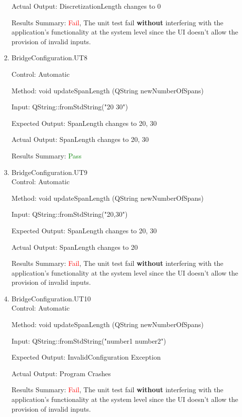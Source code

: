 \documentclass[12pt, titlepage]{article}
\begin{document}
\begin{enumerate}
    Actual Output: DiscretizationLength changes to 0

    Results Summary: \textcolor{red} {Fail}, The unit test fail
\textbf{without} interfering with the application’s functionality at the system level
since the UI doesn’t allow the provision of invalid inputs.

    \item {BridgeConfiguration.UT8\\}

    Control: Automatic
    
    Method:  void updateSpanLength (QString newNumberOfSpans)
    
    Input: QString::fromStdString("20 30")
    
    Expected Output: SpanLength changes to {20, 30}

    Actual Output: SpanLength changes to {20, 30}

    Results Summary: \textcolor{green} {Pass}

    \item {BridgeConfiguration.UT9\\}
    Control: Automatic
    
    Method:  void updateSpanLength (QString newNumberOfSpans)
    
    Input: QString::fromStdString("20,30")
    
    Expected Output: SpanLength changes to {20, 30}

    Actual Output: SpanLength changes to {20}

    Results Summary: \textcolor{red} {Fail}, The unit test fail
\textbf{without} interfering with the application’s functionality at the system level
since the UI doesn’t allow the provision of invalid inputs.

    \item {BridgeConfiguration.UT10\\}
    Control: Automatic
    
    Method:  void updateSpanLength (QString newNumberOfSpans)
    
    Input: QString::fromStdString("number1 number2")
    
    Expected Output: InvalidConfiguration Exception

    Actual Output: Program Crashes

    Results Summary: \textcolor{red} {Fail}, The unit test fail
\textbf{without} interfering with the application’s functionality at the system level
since the UI doesn’t allow the provision of invalid inputs.


\end{enumerate}
\end{document}

